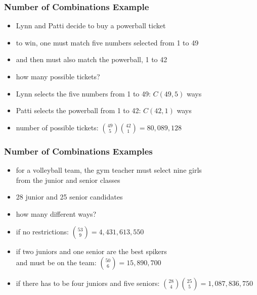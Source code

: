 \documentclass[dvipsnames]{beamer}
\begin{document}
\begin{frame}
  \frametitle{Number of Combinations Example}
  
  \begin{example}
    \begin{itemize}
      \item Lynn and Patti decide to buy a powerball ticket
      \item to win, one must match five numbers selected from 1 to 49
      \item and then must also match the powerball, 1 to 42
      \item how many possible tickets?

      \pause
      \medskip
      \item Lynn selects the five numbers from 1 to 49: $C(49,5)$ ways
      \item Patti selects the powerball from 1 to 42: $C(42,1)$ ways
      \item number of possible tickets:
        ${49 \choose 5}{42 \choose 1} = 80,089,128$
    \end{itemize}
  \end{example}
\end{frame}

\begin{frame}
  \frametitle{Number of Combinations Examples}

  \begin{example}
    \begin{itemize}
      \item for a volleyball team, the gym teacher must select nine girls\\
        from the junior and senior classes
      \item 28 junior and 25 senior candidates
      \item how many different ways?

      \pause
      \medskip
      \item if no restrictions: ${53 \choose 9} = 4,431,613,550$
      \pause
      \item if two juniors and one senior are the best spikers\\
        and must be on the team: ${50 \choose 6} = 15,890,700$
      \pause
      \item if there has to be four juniors and five seniors:
        ${28 \choose 4}{25 \choose 5} = 1,087,836,750$
    \end{itemize}
  \end{example}
\end{frame}
\end{document}
